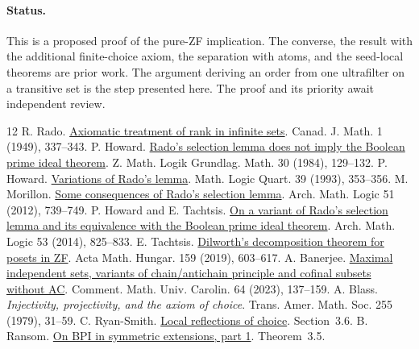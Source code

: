 \documentclass[11pt]{article}
\begin{document}
\paragraph{Status.} This is a proposed proof of the pure-ZF implication. The converse, the result with the additional finite-choice axiom, the separation with atoms, and the seed-local theorems are prior work. The argument deriving an order from one ultrafilter on a transitive set is the step presented here. The proof and its priority await independent review.
\begin{thebibliography}{12}
 R. Rado. \href{https://doi.org/10.4153/CJM-1949-031-1}{Axiomatic treatment of rank in infinite sets}. Canad. J. Math. 1 (1949), 337--343.
 P. Howard. \href{https://doi.org/10.1002/malq.19840300902}{Rado's selection lemma does not imply the Boolean prime ideal theorem}. Z. Math. Logik Grundlag. Math. 30 (1984), 129--132.
 P. Howard. \href{https://doi.org/10.1002/malq.19930390139}{Variations of Rado's lemma}. Math. Logic Quart. 39 (1993), 353--356.
 M. Morillon. \href{https://doi.org/10.1007/s00153-012-0296-5}{Some consequences of Rado's selection lemma}. Arch. Math. Logic 51 (2012), 739--749.
 P. Howard and E. Tachtsis. \href{https://doi.org/10.1007/s00153-014-0390-y}{On a variant of Rado's selection lemma and its equivalence with the Boolean prime ideal theorem}. Arch. Math. Logic 53 (2014), 825--833.
 E. Tachtsis. \href{https://doi.org/10.1007/s10474-019-00967-w}{Dilworth's decomposition theorem for posets in ZF}. Acta Math. Hungar. 159 (2019), 603--617.
 A. Banerjee. \href{https://dml.cz/handle/10338.dmlcz/151857}{Maximal independent sets, variants of chain/antichain principle and cofinal subsets without AC}. Comment. Math. Univ. Carolin. 64 (2023), 137--159.
 A. Blass. \emph{Injectivity, projectivity, and the axiom of choice}. Trans. Amer. Math. Soc. 255 (1979), 31--59.
 C. Ryan-Smith. \href{https://arxiv.org/abs/2412.13785}{Local reflections of choice}. Section~3.6.
 B. Ransom. \href{https://arxiv.org/abs/2511.21684}{On BPI in symmetric extensions, part 1}. Theorem~3.5.
\end{thebibliography}
\end{document}
